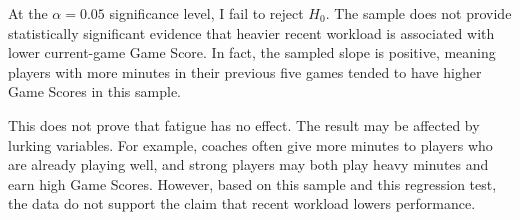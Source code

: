 \documentclass[12pt]{article}
\begin{document}
At the $\alpha = 0.05$ significance level, I fail to reject $H_0$. The sample does not provide statistically significant evidence that heavier recent workload is associated with lower current-game Game Score. In fact, the sampled slope is positive, meaning players with more minutes in their previous five games tended to have higher Game Scores in this sample.

This does not prove that fatigue has no effect. The result may be affected by lurking variables. For example, coaches often give more minutes to players who are already playing well, and strong players may both play heavy minutes and earn high Game Scores. However, based on this sample and this regression test, the data do not support the claim that recent workload lowers performance.
\end{document}
